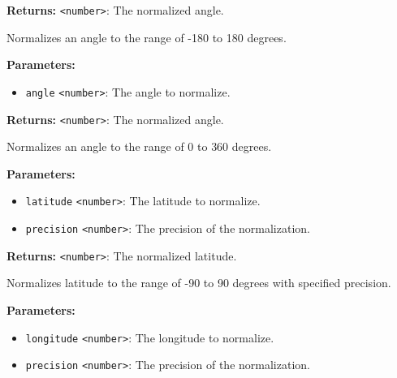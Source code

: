 \documentclass[12pt,a4paper]{article}
\begin{document}
\noindent \textbf{Returns:} \texttt{<number>}: The normalized angle.

\noindent Normalizes an angle to the range of -180 to 180 degrees.

\vspace{5mm}
\noindent {}


\noindent \textbf{Parameters:}
\begin{itemize}
  \item \texttt{angle} \texttt{<number>}: The angle to normalize.
\end{itemize}

\noindent \textbf{Returns:} \texttt{<number>}: The normalized angle.

\noindent Normalizes an angle to the range of 0 to 360 degrees.

\vspace{5mm}
\noindent {}


\noindent \textbf{Parameters:}
\begin{itemize}
  \item \texttt{latitude} \texttt{<number>}: The latitude to normalize.
  \item \texttt{precision} \texttt{<number>}: The precision of the normalization.
\end{itemize}

\noindent \textbf{Returns:} \texttt{<number>}: The normalized latitude.

\noindent Normalizes latitude to the range of -90 to 90 degrees with specified precision.

\vspace{5mm}
\noindent {}


\noindent \textbf{Parameters:}
\begin{itemize}
  \item \texttt{longitude} \texttt{<number>}: The longitude to normalize.
  \item \texttt{precision} \texttt{<number>}: The precision of the normalization.
\end{itemize}
\end{document}
